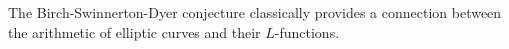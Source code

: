 The Birch-Swinnerton-Dyer conjecture classically provides a connection between the arithmetic of elliptic curves and their $L$-functions. 